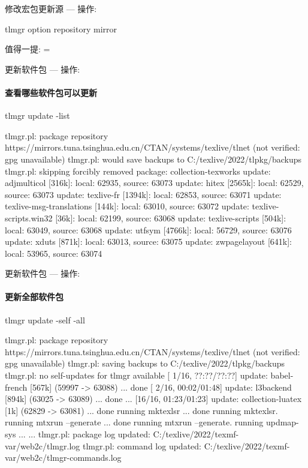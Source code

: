 \begin{frame}[fragile]{修改宏包更新源 --- 操作: }

\begin{cmdcode}
tlmgr option repository mirror
\end{cmdcode}

值得一提:  = 
\end{frame}

\begin{frame}[fragile]{更新软件包 --- 操作: }
\framesubtitle{查看哪些软件包可以更新}

\begin{cmdcode}
tlmgr update -list
\end{cmdcode}
\begin{outputcode}
tlmgr.pl: package repository https://mirrors.tuna.tsinghua.edu.cn/CTAN/systems/texlive/tlnet (not verified: gpg unavailable)
tlmgr.pl: would save backups to C:/texlive/2022/tlpkg/backups
tlmgr.pl: skipping forcibly removed package: collection-texworks
update:   adjmulticol   [316k]: local:  62935, source:  63073
update:   hitex         [2565k]: local:  62529, source:  63073
update:   texlive-fr    [1394k]: local:  62853, source:  63071
update:   texlive-msg-translations [144k]: local:  63010, source:  63072
update:   texlive-scripts.win32 [36k]: local:  62199, source:  63068
update:   texlive-scripts [504k]: local:  63049, source:  63068
update:   utfsym         [4766k]: local:  56729, source:  63076
update:   xduts          [871k]: local:  63013, source:  63075
update:   zwpagelayout   [641k]: local:  53965, source:  63074  
\end{outputcode}
\end{frame}

\begin{frame}[fragile]{更新软件包 --- 操作: }
\framesubtitle{更新全部软件包}

\begin{cmdcode}
tlmgr update -self -all
\end{cmdcode}
\begin{outputcode}
tlmgr.pl: package repository https://mirrors.tuna.tsinghua.edu.cn/CTAN/systems/texlive/tlnet (not verified: gpg unavailable)
tlmgr.pl: saving backups to C:/texlive/2022/tlpkg/backups
tlmgr.pl: no self-updates for tlmgr available
[ 1/16, ??:??/??:??] update: babel-french [567k] (59997 -> 63088) ... done
[ 2/16, 00:02/01:48] update: l3backend [894k] (63025 -> 63089) ... done
...
[16/16, 01:23/01:23] update: collection-luatex [1k] (62829 -> 63081) ... done
running mktexlsr ...
done running mktexlsr.
running mtxrun --generate ...
done running mtxrun --generate.
running updmap-sys ...
...
tlmgr.pl: package log updated: C:/texlive/2022/texmf-var/web2c/tlmgr.log
tlmgr.pl: command log updated: C:/texlive/2022/texmf-var/web2c/tlmgr-commands.log
\end{outputcode}
\end{frame}


